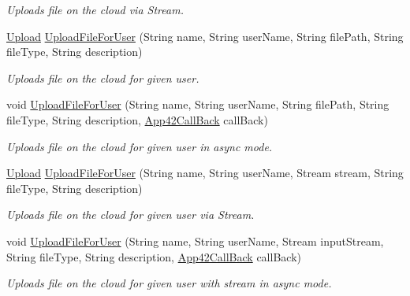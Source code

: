 \begin{DoxyCompactItemize}
\begin{DoxyCompactList}\small\item\em Uploads file on the cloud via Stream. \end{DoxyCompactList}\item 
\hyperlink{classcom_1_1shephertz_1_1app42_1_1paas_1_1sdk_1_1csharp_1_1upload_1_1_upload}{Upload} \hyperlink{classcom_1_1shephertz_1_1app42_1_1paas_1_1sdk_1_1csharp_1_1upload_1_1_upload_service_ac2184711eca0574145987724503c412f}{Upload\+File\+For\+User} (String name, String user\+Name, String file\+Path, String file\+Type, String description)
\begin{DoxyCompactList}\small\item\em Uploads file on the cloud for given user. \end{DoxyCompactList}\item 
void \hyperlink{classcom_1_1shephertz_1_1app42_1_1paas_1_1sdk_1_1csharp_1_1upload_1_1_upload_service_a26b6816db84d7e424cc0f0be68940af3}{Upload\+File\+For\+User} (String name, String user\+Name, String file\+Path, String file\+Type, String description, \hyperlink{interfacecom_1_1shephertz_1_1app42_1_1paas_1_1sdk_1_1csharp_1_1_app42_call_back}{App42\+Call\+Back} call\+Back)
\begin{DoxyCompactList}\small\item\em Uploads file on the cloud for given user in async mode. \end{DoxyCompactList}\item 
\hyperlink{classcom_1_1shephertz_1_1app42_1_1paas_1_1sdk_1_1csharp_1_1upload_1_1_upload}{Upload} \hyperlink{classcom_1_1shephertz_1_1app42_1_1paas_1_1sdk_1_1csharp_1_1upload_1_1_upload_service_a11df1eff9bb8e89f6764c610a96b343c}{Upload\+File\+For\+User} (String name, String user\+Name, Stream stream, String file\+Type, String description)
\begin{DoxyCompactList}\small\item\em Uploads file on the cloud for given user via Stream. \end{DoxyCompactList}\item 
void \hyperlink{classcom_1_1shephertz_1_1app42_1_1paas_1_1sdk_1_1csharp_1_1upload_1_1_upload_service_ae28fabe7ae9c5d46fa55455e389de62b}{Upload\+File\+For\+User} (String name, String user\+Name, Stream input\+Stream, String file\+Type, String description, \hyperlink{interfacecom_1_1shephertz_1_1app42_1_1paas_1_1sdk_1_1csharp_1_1_app42_call_back}{App42\+Call\+Back} call\+Back)
\begin{DoxyCompactList}\small\item\em Uploads file on the cloud for given user with stream in async mode. \end{DoxyCompactList}\item 

\end{DoxyCompactItemize}
